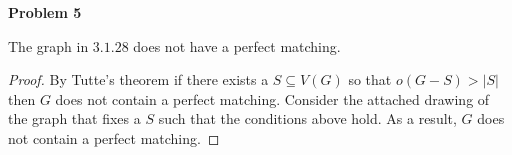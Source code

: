 \documentclass{article}
\newenvironment{claim}[2][Claim]{\begin{trivlist}
		\item[\hskip \labelsep {\bfseries #1}\hskip \labelsep {\bfseries #2}]}{\end{trivlist}}
\begin{document}
\noindent \textbf{Problem 5}
\begin{claim}{}
The graph in $3.1.28$ does not have a perfect matching.
\end{claim}
\begin{proof}
By Tutte's theorem if there exists a $S \subseteq V(G)$ so that $o(G - S) > |S|$ then $G$ does not contain a perfect matching. Consider the attached drawing of the graph that fixes a $S$ such that the conditions above hold. As a result, $G$ does not contain a perfect matching.
\end{proof}
\end{document}
